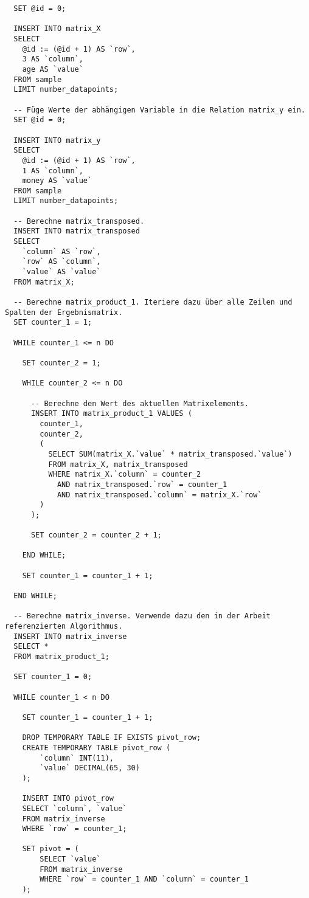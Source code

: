 \begin{verbatim}
  SET @id = 0;

  INSERT INTO matrix_X
  SELECT
    @id := (@id + 1) AS `row`,
    3 AS `column`,
    age AS `value`
  FROM sample
  LIMIT number_datapoints;

  -- Füge Werte der abhängigen Variable in die Relation matrix_y ein.
  SET @id = 0;

  INSERT INTO matrix_y
  SELECT
    @id := (@id + 1) AS `row`,
    1 AS `column`,
    money AS `value`
  FROM sample
  LIMIT number_datapoints;

  -- Berechne matrix_transposed.
  INSERT INTO matrix_transposed
  SELECT
    `column` AS `row`,
    `row` AS `column`,
    `value` AS `value`
  FROM matrix_X;

  -- Berechne matrix_product_1. Iteriere dazu über alle Zeilen und Spalten der Ergebnismatrix.
  SET counter_1 = 1;

  WHILE counter_1 <= n DO

    SET counter_2 = 1;

    WHILE counter_2 <= n DO

      -- Berechne den Wert des aktuellen Matrixelements.
      INSERT INTO matrix_product_1 VALUES (
        counter_1,
        counter_2,
        (
          SELECT SUM(matrix_X.`value` * matrix_transposed.`value`)
          FROM matrix_X, matrix_transposed
          WHERE matrix_X.`column` = counter_2
            AND matrix_transposed.`row` = counter_1
            AND matrix_transposed.`column` = matrix_X.`row`
        )
      );

      SET counter_2 = counter_2 + 1;

    END WHILE;

    SET counter_1 = counter_1 + 1;

  END WHILE;

  -- Berechne matrix_inverse. Verwende dazu den in der Arbeit referenzierten Algorithmus.
  INSERT INTO matrix_inverse
  SELECT *
  FROM matrix_product_1;

  SET counter_1 = 0;

  WHILE counter_1 < n DO

    SET counter_1 = counter_1 + 1;

    DROP TEMPORARY TABLE IF EXISTS pivot_row;
    CREATE TEMPORARY TABLE pivot_row (
        `column` INT(11),
        `value` DECIMAL(65, 30)
    );

    INSERT INTO pivot_row
    SELECT `column`, `value`
    FROM matrix_inverse
    WHERE `row` = counter_1;

    SET pivot = (
        SELECT `value`
        FROM matrix_inverse
        WHERE `row` = counter_1 AND `column` = counter_1
    );


\end{verbatim}
